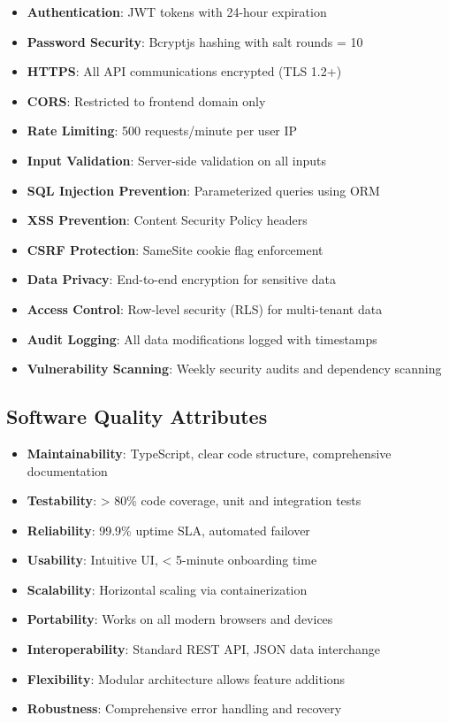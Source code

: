 \documentclass[12pt,a4paper]{article}
\begin{document}
\begin{itemize}
    \item \textbf{Authentication}: JWT tokens with 24-hour expiration
    \item \textbf{Password Security}: Bcryptjs hashing with salt rounds = 10
    \item \textbf{HTTPS}: All API communications encrypted (TLS 1.2+)
    \item \textbf{CORS}: Restricted to frontend domain only
    \item \textbf{Rate Limiting}: 500 requests/minute per user IP
    \item \textbf{Input Validation}: Server-side validation on all inputs
    \item \textbf{SQL Injection Prevention}: Parameterized queries using ORM
    \item \textbf{XSS Prevention}: Content Security Policy headers
    \item \textbf{CSRF Protection}: SameSite cookie flag enforcement
    \item \textbf{Data Privacy}: End-to-end encryption for sensitive data
    \item \textbf{Access Control}: Row-level security (RLS) for multi-tenant data
    \item \textbf{Audit Logging}: All data modifications logged with timestamps
    \item \textbf{Vulnerability Scanning}: Weekly security audits and dependency scanning
\end{itemize}

\subsection{Software Quality Attributes}

\begin{itemize}
    \item \textbf{Maintainability}: TypeScript, clear code structure, comprehensive documentation
    \item \textbf{Testability}: > 80\% code coverage, unit and integration tests
    \item \textbf{Reliability}: 99.9\% uptime SLA, automated failover
    \item \textbf{Usability}: Intuitive UI, < 5-minute onboarding time
    \item \textbf{Scalability}: Horizontal scaling via containerization
    \item \textbf{Portability}: Works on all modern browsers and devices
    \item \textbf{Interoperability}: Standard REST API, JSON data interchange
    \item \textbf{Flexibility}: Modular architecture allows feature additions
    \item \textbf{Robustness}: Comprehensive error handling and recovery
\end{itemize}
\end{document}
